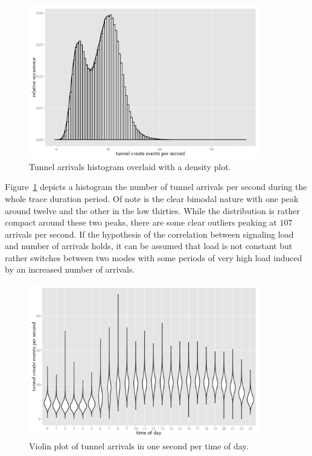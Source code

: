 \begin{figure}[htb]
	\centering
	\includegraphics[width=0.9\textwidth]{images/R-create-frequency.pdf}
	\caption{Tunnel arrivals histogram overlaid with a density plot.}
\label{c4:fig:freq-arrivals}
\end{figure}

Figure~\ref{c4:fig:freq-arrivals} depicts a histogram the number of tunnel arrivals per second during the whole trace duration period. Of note is the clear bimodal nature with one peak around twelve and the other in the low thirties. While the distribution is rather compact around these two peaks, there are some clear outliers peaking at $107$ arrivals per second. If the hypothesis of the correlation between signaling load and number of arrivals holds, it can be assumed that load is not constant but rather switches between two modes with some periods of very high load induced by an increased number of arrivals.

\begin{figure}[htb]
	\centering
	\includegraphics[width=0.9\textwidth]{images/R-createspersecond-1h-violin.pdf}
	\caption{Violin plot of tunnel arrivals in one second per time of day.}
\label{c4:fig:freq-arrivals-per-second-violin}
\end{figure}

